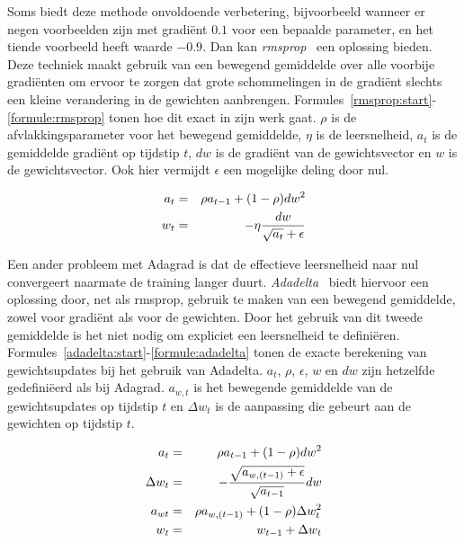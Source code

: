 Soms biedt deze methode onvoldoende verbetering, bijvoorbeeld wanneer er negen voorbeelden zijn met gradi\"ent $0.1$ voor een bepaalde parameter, en het tiende voorbeeld heeft waarde $-0.9$. Dan kan \emph{rmsprop}~\cite{RMSprop} een oplossing bieden. Deze techniek maakt gebruik van een bewegend gemiddelde over alle voorbije gradi\"enten om ervoor te zorgen dat grote schommelingen in de gradi\"ent slechts een kleine verandering in de gewichten aanbrengen. Formules~\eqref{rmsprop:start}-\eqref{formule:rmsprop} tonen hoe dit exact in zijn werk gaat. $\rho$ is de afvlakkingsparameter voor het bewegend gemiddelde, $\eta$ is de leersnelheid, $a_t$ is de gemiddelde gradi\"ent op tijdstip $t$, $dw$ is de gradi\"ent van de gewichtsvector en $w$ is de gewichtsvector. Ook hier vermijdt $\epsilon$ een mogelijke deling door nul.

\begin{eqnarray}
\vspace{-3mm}
    \label{rmsprop:start}
    a_t & = & \rho  a_{t-1} + (1 - \rho)dw^2 \\
    w_t & = &  - \eta \frac{dw}{\sqrt{a_t} + \epsilon}
    \label{formule:rmsprop}
    \vspace{-3mm}
\end{eqnarray}

Een ander probleem met Adagrad is dat de effectieve leersnelheid naar nul convergeert naarmate de training langer duurt. \emph{Adadelta}~\cite{Zeiler2012} biedt hiervoor een oplossing door, net als rmsprop, gebruik te maken van een bewegend gemiddelde, zowel voor gradi\"ent als voor de gewichten. Door het gebruik van dit tweede gemiddelde is het niet nodig om expliciet een leersnelheid te defini\"eren. Formules~\eqref{adadelta:start}-\eqref{formule:adadelta} tonen de exacte berekening van gewichtsupdates bij het gebruik van Adadelta. $a_t$, $\rho$, $\epsilon$, $w$ en $dw$ zijn hetzelfde gedefini\"eerd als bij Adagrad. $a_{w,t}$ is het bewegende gemiddelde van de gewichtsupdates op tijdstip $t$ en $\Delta w_t$ is de aanpassing die gebeurt aan de gewichten op tijdstip $t$.

\begin{eqnarray}
\vspace{-3mm}
    \label{adadelta:start}
    a_t & = & \rho  a_{t-1} + (1 - \rho)dw^2 \\
    \Delta w_t & = & - \frac{\sqrt{a_{w,(t-1)} + \epsilon}}{\sqrt{a_{t-1}}}dw \\
    a_{wt} & = & \rho  a_{w,(t-1)} + (1 - \rho)\Delta w_t^2 \\
    w_t & = & w_{t-1} + \Delta w_t
    \label{formule:adadelta}
    \vspace{-3mm}
\end{eqnarray}


